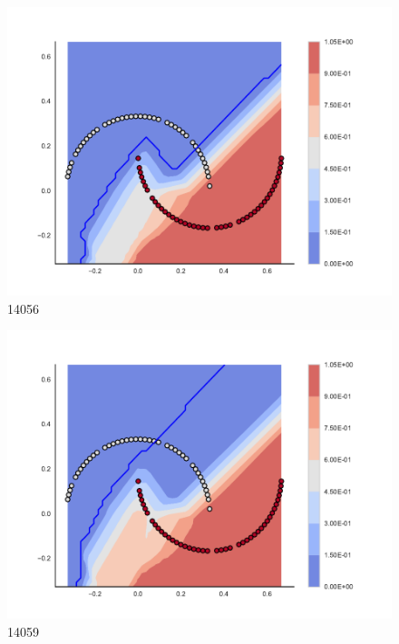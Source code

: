 \begin{subfigure}[b]{0.09\textwidth}
    \includegraphics[clip, trim=2.35cm 1.75cm 4.5cm 0cm,width=\textwidth]{img/convergence/14056.pdf}
    \caption{14056}
    \label{fig:convergence_14056}
\end{subfigure}
%
\begin{subfigure}[b]{0.09\textwidth}
    \includegraphics[clip, trim=2.35cm 1.75cm 4.5cm 0cm,width=\textwidth]{img/convergence/14059.pdf}
    \caption{14059}
    \label{fig:convergence_14059}
\end{subfigure}
%
